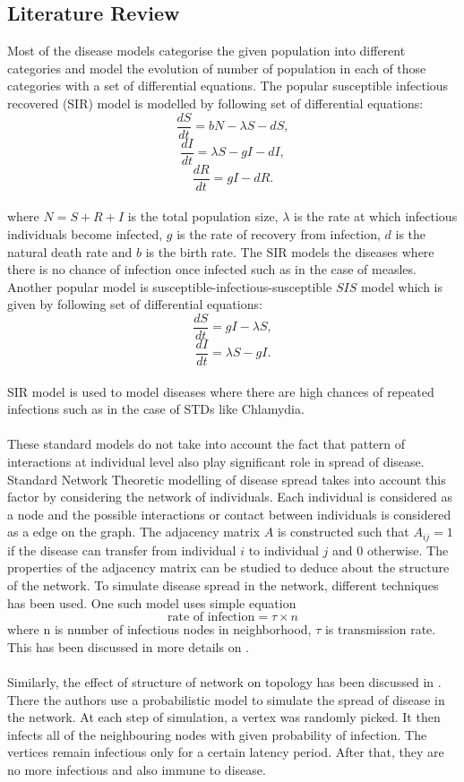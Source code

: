 \documentclass[11pt]{article}
\begin{document}
\subsection{Literature Review}
Most of the disease models categorise the given population into different categories and model the evolution of number of population in each of those categories with a set of differential equations. The popular susceptible infectious recovered (SIR) model is modelled by following set of differential equations:
\[ \frac{dS}{dt} = bN - \lambda S - dS,  \]
\[ \frac{dI}{dt} = \lambda S - gI - dI, \]
\[ \frac{dR}{dt} = gI - dR. \]\\
where $N = S + R + I$ is the total population size, $\lambda$ is the rate at which infectious individuals become infected, $g$ is the rate of recovery from infection, $d$ is the natural death rate and $b$ is the birth rate. The SIR models the diseases where there is no chance of infection once infected such as in the case of measles. Another popular model is susceptible-infectious-susceptible $SIS$ model which is given by following set of differential equations:
\[ \frac{dS}{dt} = gI - \lambda S,  \]
\[ \frac{dI}{dt} = \lambda S - gI. \]\\
SIR model is used to model diseases where there are high chances of repeated infections such as in the case of STDs like Chlamydia.\\
\\
These standard models do not take into account the fact that pattern of interactions at individual level also play significant role in spread of disease. Standard Network Theoretic modelling of disease spread takes into account this factor by considering the network of individuals. Each individual is considered as a node and the possible interactions or contact between individuals is considered as a edge on the graph. The adjacency matrix $A$ is constructed such that $A_{ij} = 1$ if the disease can transfer from individual $i$ to individual $j$ and $0$ otherwise. The properties of the adjacency matrix can be studied to deduce about the structure of the network. To simulate disease spread in the network, different techniques has been used. One such model uses simple equation
\[ \text {rate of infection} = \tau \times n \] where n is number of infectious nodes in neighborhood, $\tau$ is transmission rate. This has been discussed in more details on \cite{keeling}.\\
\\
Similarly, the effect of structure of network on topology has been discussed in \cite{shirley}. There the authors use a probabilistic model to simulate the spread of disease in the network. At each step of simulation, a vertex was randomly picked. It then infects all of the neighbouring nodes with given probability of infection. The vertices remain infectious only for a certain latency period. After that, they are no more infectious and also immune to disease.
\end{document}
